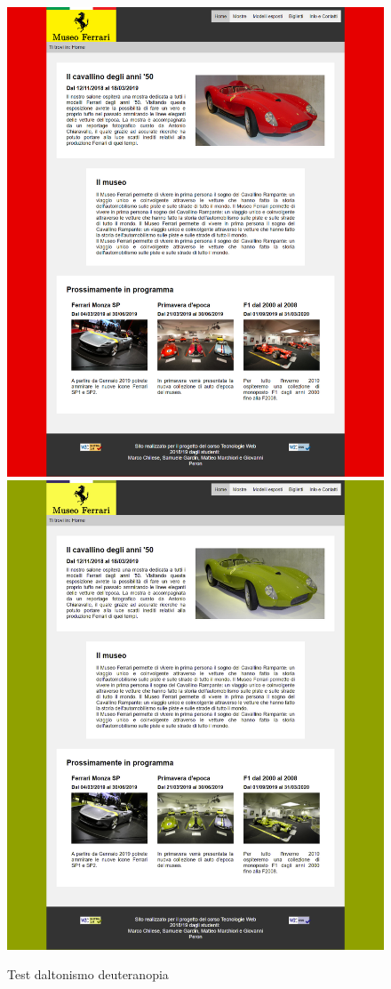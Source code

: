 \begin{figure}[H]
	\begin{center}
		\includegraphics[scale=0.15]{Images/original.png}
		\includegraphics[scale=0.15]{Images/deuteranopia.png}
		\caption{Test daltonismo deuteranopia}
	\end{center}
\end{figure}

